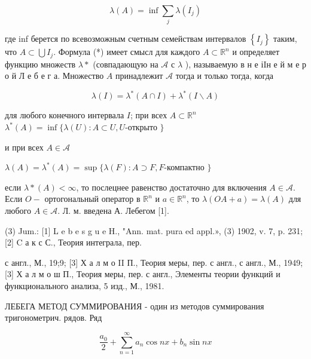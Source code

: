 \documentclass[10pt]{article}
\begin{document}
\[

\lambda(A)=\inf \sum_{j} \lambda\left(I_{j}\right)

\]



где inf берется по всевозможным счетным семействам интервалов $\left\{I_{j}\right\}$ таким, что $A \subset \bigcup I_{j}$. Формула (*) имеет смысл для каждого $A \subset \mathbb{R}^{n}$ и определяет функцию множеств $\lambda *$ (совпадающую на $\mathcal{A}$ с $\lambda$ ), называемую в н е іIн е й м е р о й Л е б е г а. Множество $A$ принадлежит $\mathscr{A}$ тогда и только тогда, когда



\[

\lambda(I)=\lambda^{*}(A \cap I)+\lambda^{*}(I \backslash A)

\]



для любого конечного интервала $I$; при всех $A \subset \mathbb{R}^{n}$ $\lambda^{*}(A)=\inf \{\lambda(U): A \subset U, U$-открыто $\}$



и при всех $A \in \mathcal{A}$



$\lambda(A)=\lambda^{*}(A)=\sup \{\lambda(F): A \supset F, F$-компактно $\}$



если $\lambda *(A)<\infty$, то послецнее равенство достаточно для включения $A \in \mathcal{A}$. Если $O-$ ортогональный оператор в $\mathbb{R}^{n}$ и $a \in \mathbb{R}^{n}$, то $\lambda(O A+a)=\lambda(A)$ для любого $A \in \mathcal{A}$. Л. м. введена А. Лебегом [1].



(3) Jum.: [1] L e b e s g u e H., "Ann. mat. pura ed appl.», (3) 1902, v. 7, p. 231; [2] C а к с С., Теория интеграла, пер.

с англ., М., 19;9; [3] Х а л м о II П., Теория меры, пер. с англ., с англ., М., 1949; [3] Х а л м о ш П., Теория меры, пер. с англ., Элементы теории функций и функционального анализа, 5 изд., М., 1981.



ЛЕБЕГА МЕТОД СУММИРОВАНИЯ - один из методов суммирования тригонометрич. рядов. Ряд



\[

\frac{a_{0}}{2}+\sum_{n=1}^{\infty} a_{n} \cos n x+b_{n} \sin n x

\]
\end{document}
